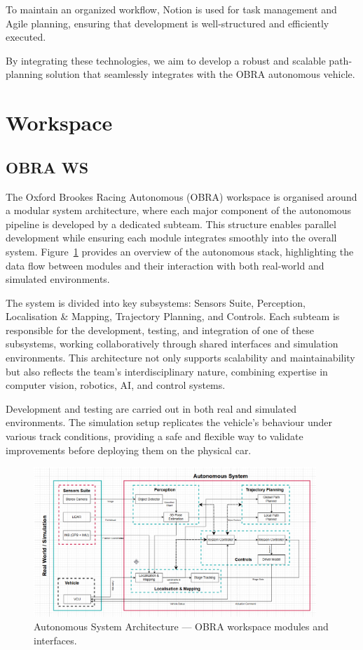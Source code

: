 \documentclass[a4paper,11pt]{report}
\begin{document}
To maintain an organized workflow, Notion is used for task management and Agile planning, ensuring that development is well-structured and efficiently executed.

By integrating these technologies, we aim to develop a robust and scalable path-planning solution that seamlessly integrates with the OBRA autonomous vehicle.

\section{Workspace}
\subsection{OBRA WS}

The Oxford Brookes Racing Autonomous (OBRA) workspace is organised around a modular system architecture, where each major component of the autonomous pipeline is developed by a dedicated subteam. This structure enables parallel development while ensuring each module integrates smoothly into the overall system. Figure~\ref{fig:software_architecture} provides an overview of the autonomous stack, highlighting the data flow between modules and their interaction with both real-world and simulated environments.

The system is divided into key subsystems: Sensors Suite, Perception, Localisation \& Mapping, Trajectory Planning, and Controls. Each subteam is responsible for the development, testing, and integration of one of these subsystems, working collaboratively through shared interfaces and simulation environments. This architecture not only supports scalability and maintainability but also reflects the team's interdisciplinary nature, combining expertise in computer vision, robotics, AI, and control systems.

Development and testing are carried out in both real and simulated environments. The simulation setup replicates the vehicle’s behaviour under various track conditions, providing a safe and flexible way to validate improvements before deploying them on the physical car.

\begin{figure}[H]
    \centering
    \includegraphics[width=0.95\textwidth]{Images/SoftwareArchitecture.png}
    \caption{Autonomous System Architecture — OBRA workspace modules and interfaces.}
    \label{fig:software_architecture}
\end{figure}
\end{document}
